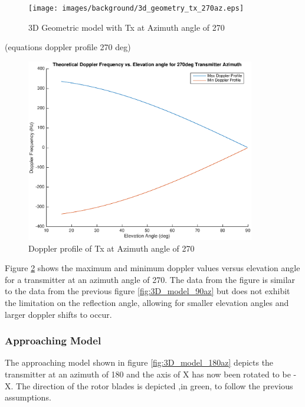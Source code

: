 \begin{figure}
	\begin{center}
		\texttt{[image: images/background/3d\_geometry\_tx\_270az.eps]}
		\caption{3D Geometric model with Tx at Azimuth angle of 270\textdegree}
		\label{fig:3D_model_270az}
	\end{center}
\end{figure}

(equations doppler profile 270 deg)

\begin{figure}
	\begin{center}
		\includegraphics[width=10cm]{images/background/3d_geometry_tx_270az_doppler_profile.eps}
		\caption{Doppler profile of Tx at Azimuth angle of 270\textdegree}
		\label{fig:3D_model_270az_doppler}
	\end{center}
\end{figure}

Figure \ref{fig:3D_model_270az_doppler} shows the maximum and minimum doppler values versus elevation angle for a transmitter at an azimuth angle of 270\textdegree. The data from the figure is similar to the data from the previous figure \ref{fig:3D_model_90az} but does not exhibit the limitation on the reflection angle, allowing for smaller elevation angles and larger doppler shifts to occur.

\subsubsection{Approaching Model}
The approaching model shown in figure \ref{fig:3D_model_180az} depicts the transmitter at an azimuth of 180 \textdegree \space and the axis of X has now been rotated to be -X. The direction of the rotor blades is depicted ,in green, to follow the previous assumptions.

